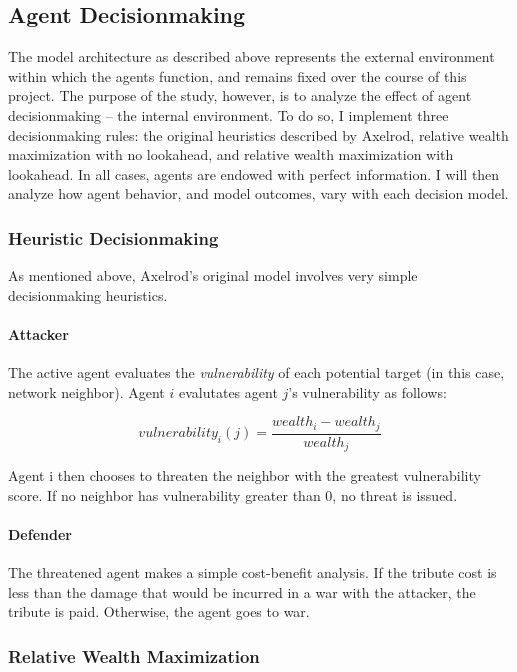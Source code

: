 \documentclass{article}
\begin{document}
\subsection{Agent Decisionmaking}
The model architecture as described above represents the external environment within which the agents function, and remains fixed over the course of this project. The purpose of the study, however, is to analyze the effect of agent decisionmaking -- the internal environment. To do so, I implement three decisionmaking rules: the original heuristics described by Axelrod, relative wealth maximization with no lookahead, and relative wealth maximization with lookahead. In all cases, agents are endowed with perfect information.  I will then analyze how agent behavior, and model outcomes, vary with each decision model.

\subsubsection{Heuristic Decisionmaking}

As mentioned above, Axelrod's original model involves very simple decisionmaking heuristics.

\paragraph{Attacker}
The active agent evaluates the \emph{vulnerability} of each potential target (in this case, network neighbor). Agent $i$ evalutates agent $j$'s vulnerability as follows:

\[
vulnerability_{i}(j)=\frac{wealth_i - wealth_j}{wealth_j}
\]

Agent i then chooses to threaten the neighbor with the greatest vulnerability score. If no neighbor has vulnerability greater than 0, no threat is issued.

\paragraph{Defender}
The threatened agent makes a simple cost-benefit analysis. If the tribute cost is less than the damage that would be incurred in a war with the attacker, the tribute is paid. Otherwise, the agent goes to war. 

\subsubsection{Relative Wealth Maximization}
\end{document}
